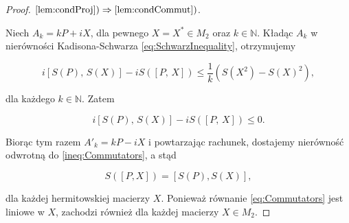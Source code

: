 \begin{proof}
$\ref{lem:condProj}) \Rightarrow \ref{lem:condCommut})$.

Niech $A_{k} = kP + iX$, dla pewnego $X = X^{*} \in M_2$
oraz $k \in \mathbb{N}$.
Kładąc $A_{k}$ w nierówności Kadisona-Schwarza
\eqref{eq:SchwarzInequality}, otrzymujemy
\begin{linenomath*}
 \begin{equation}
i [S(P), \,  S(X)] - i S([P, \, X])  \leq \frac{1}{k} \left( S(X^{2}) - S(X)^{2} \right),
 \end{equation}
\end{linenomath*}
dla każdego $k \in \mathbb{N}$.
Zatem
\begin{linenomath*}
 \begin{equation}
\label{ineq:Commutators}
i [S(P), \, S(X)] - i S([P, \, X]) \leq 0.
 \end{equation}
\end{linenomath*}
Biorąc tym razem $A'_{k} =kP - i X$ i powtarzając rachunek,
dostajemy nierówność odwrotną do \eqref{ineq:Commutators},
a stąd
\begin{linenomath*}
 \begin{equation}
\label{eq:Commutators}
S([P, X]) = [S(P), S(X)],
 \end{equation}
\end{linenomath*}
dla każdej hermitowskiej macierzy $X$.
Ponieważ równanie \eqref{eq:Commutators} jest liniowe w $X$,
zachodzi również dla każdej macierzy $X \in M_{2}$.


\end{proof}
